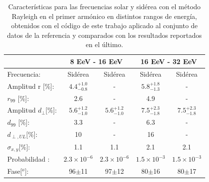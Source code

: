 \begin{table}[H]
    \begin{small}
        \begin{center}
            \begin{tabular}[c]{l|c|c||c|c|}
                                            & \multicolumn{2}{c||}{8 EeV - 16 EeV}              & \multicolumn{2}{c|}{16 EeV - 32 EeV}                   \\ \hline
                Frecuencia:                 & Sidérea                    & Sidérea \cite{Aab_2020} & Sidérea                   & Sidérea \cite{Aab_2020}   \\ \hline
                Amplitud r [\%]:            & $4.4^{+1.0}_{-0.8}$ 	    & -                      & $5.8^{+1.8}_{-1.3}$ 	    & -                         \\
                $r_{99}$ [\%]:              & 2.6                       & -                      & 4.9                      & -                          \\\hline
                Amplitud $d_\perp$[\%]:     & $5.6^{+1.2}_{-1.0}$ 	    & $5.6^{+1.2}_{-1.0}$    & $7.5^{+2.3}_{-1.8}$ 	    & $7.5^{+2.3}_{-1.8}$                   \\
                $d_{99}$ [\%]:              & 3.3                       & -                      & 6.3                      & -                         \\
                $d_{\perp,UL}$[\%]:         & 10                        & -                      & 16                       & -                                 \\\hline
                $\sigma_{x,y}$[\%]:         & 1.1	                    & 1.1                    & 2.1	                    & 2.1                           \\
                Probabilidad      :         & $2.3\times10^{-6}$	    & $2.3\times10^{-6}$     & $1.5\times10^{-3}$	    & $1.5\times10^{-3}$              \\
                Fase[$^o$]:                 & 96$\pm$11                 & 97$\pm$12              & 80$\pm$16                & 80$\pm$17                     \\\hline
            \end{tabular}
        \end{center}
    \end{small}
    \caption{Características para las frecuencias solar y sidérea con el método Rayleigh en el primer armónico en distintos rangos de energía, obtenidos con el código de este trabajo aplicado al conjunto de datos de la referencia \cite{Aab_2020} y comparados con los resultados reportados en el último.}
\end{table}


